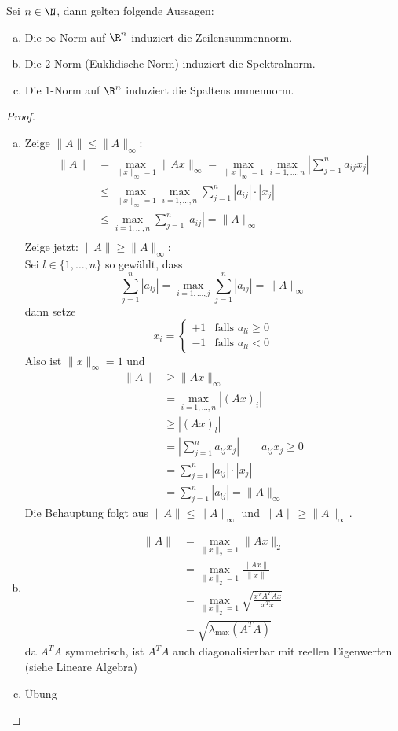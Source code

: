 \documentclass{mycourse}
\begin{document}
\begin{lem}
\label{lem:2.13}
Sei $n\in\N$, dann gelten folgende Aussagen:
\begin{enumerate}[(a)]
\item Die $\infty$-Norm auf $\R^n$ induziert die Zeilensummennorm.
\item Die $2$-Norm (Euklidische Norm) induziert die Spektralnorm.
\item Die $1$-Norm auf $\R^n$ induziert die Spaltensummennorm.
\end{enumerate}
\begin{proof}
	\begin{enumerate}[(a)]
\item
Zeige $\|A\|\le \|A\|_\infty$:
\begin{align*}
\|A\| &= \max_{\|x\|_\infty=1}\|Ax\|_\infty 
= \max_{\|x\|_\infty=1}\max_{i=1,\dotsc,n}\left|\sum_{j=1}^na_{ij}x_j\right| \\
&\le  \max_{\|x\|_\infty=1}\max_{i=1,\dotsc,n}\sum_{j=1}^n|a_{ij}|\cdot|x_j|\\
&\le \max_{i=1,\dotsc,n}\sum_{j=1}^n|a_{ij}|
= \|A\|_\infty\\
\end{align*}
Zeige jetzt: $\|A\|\ge \|A\|_\infty$:\\
Sei $l\in\{1,\dots,n\}$ so gewählt, dass
\[
\sum_{j=1}^n|a_{lj}|=\max_{i=1,\dotsc,j}\sum_{j=1}^n|a_{ij}|=\|A\|_\infty
\]
dann setze
\[
x_i = \begin{cases}
+1 & \text{falls }a_{li} \ge 0\\
-1 & \text{falls }a_{li} < 0
\end{cases}
\]
Also ist $\|x\|_\infty = 1$ und
\begin{align*}
\|A\| &\ge \|Ax\|_\infty \\
&= \max_{i=1,\dotsc,n}|(Ax)_i| \\
&\ge |(Ax)_l| \\
&= \left|\sum_{j=1}^na_{lj}x_j\right| \qquad a_{lj}x_j\ge 0\\
&= \sum_{j=1}^n|a_{lj}|\cdot|x_j|\\
&=\sum_{j=1}^n|a_{lj}|=\|A\|_\infty
\end{align*}
Die Behauptung folgt aus $\|A\|\le \|A\|_\infty$ und $\|A\| \ge \|A\|_\infty$.

\item
\begin{align*}
\|A\|&=\max_{\|x\|_2=1}\|Ax\|_2 \\
&= \max_{\|x\|_2=1}\frac{\|Ax\|}{\|x\|}\\
&= \max_{\|x\|_2=1}\sqrt{\frac {x^TA^TAx}{x^Tx}}\\
&=\sqrt{\lambda_{\text{max}}(A^TA)}
\end{align*}
da $A^TA$ symmetrisch, ist $A^TA$ auch diagonalisierbar mit reellen Eigenwerten (siehe Lineare Algebra)

\item
Übung
\end{enumerate}
\end{proof}
\end{lem}
\end{document}
